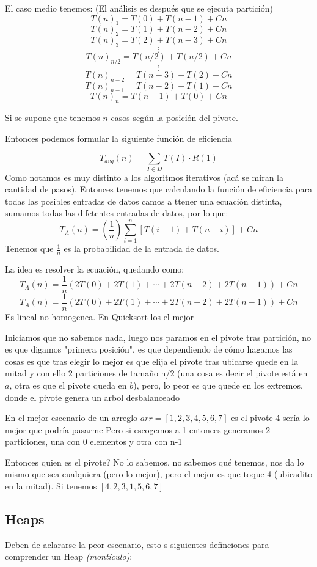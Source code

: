 El caso medio tenemos:
(El análisis es después que se ejecuta partición)
$$
	T(n)_1=T(0)+T(n-1)+Cn
$$ $$
	T(n)_2=T(1)+T(n-2)+Cn
$$ $$
	T(n)_3=T(2)+T(n-3)+Cn
$$ $$ \vdots $$ $$
	T(n)_{n/2}=T(n/2)+T(n/2)+Cn
$$ $$ \vdots $$ $$
	T(n)_{n-2}=T(n-3)+T(2)+Cn
$$ $$
	T(n)_{n-1}=T(n-2)+T(1)+Cn
$$ $$
	T(n)_n=T(n-1)+T(0)+Cn
$$

Si se supone que tenemos $n$ casos según la posición del pivote.

Entonces podemos formular la siguiente función de eficiencia

$$
	T_{avg}(n)=\sum_{I\in D}T(I)\cdot R(1)
$$
Como notamos es muy distinto a los algoritmos iterativos (acá se miran la cantidad de pasos). Entonces tenemos que calculando la función de eficiencia para todas las posibles entradas de datos camos a ttener una ecuación distinta, sumamos todas las difetentes entradas de datos, por lo que:
$$
	T_A(n)
	=(\frac1n)\sum_{i=1}^n[T(i-1)+T(n-i)]+Cn
$$
Tenemos que $\frac1n$ es la probabilidad de la entrada de datos.

La idea es resolver la ecuación, quedando como:
$$
	T_A(n)=\frac1n(2T(0)+2T(1)+\cdots+2T(n-2)+2T(n-1))+Cn
$$ $$
	T_A(n)=\frac1n(2T(0)+2T(1)+\cdots+2T(n-2)+2T(n-1))+Cn
$$
Es lineal no homogenea.
En Quicksort los el mejor

Iniciamos que no sabemos nada, luego nos paramos en el pivote tras partición, no es que digamos "primera posición", es que dependiendo de cómo hagamos las cosas es que tras elegir lo mejor es que elija el pivote tras ubicarse quede en la mitad y con ello 2 particiones de tamaño n/2 (una cosa es decir el pivote está en $a$, otra es que el pivote queda en $b$), pero, lo peor es que quede en los extremos, donde el pivote genera un arbol desbalanceado

En el mejor escenario de un arreglo $arr=[1,2,3,4,5,6,7]$ es el pivote 4 sería lo mejor que podría pasarme
Pero si escogemos a 1 entonces generamos 2 particiones, una con 0 elementos y otra con n-1

Entonces quien es el pivote? No lo sabemos, no sabemos qué tenemos, nos da lo mismo que sea cualquiera (pero lo mejor), pero el mejor es que toque 4 (ubicadito en la mitad). Si tenemos $[4,2,3,1,5,6,7]$




\subsection{Heaps}
Deben de aclararse la peor escenario, esto s siguientes definciones para comprender un Heap \textit{(montículo)}:

